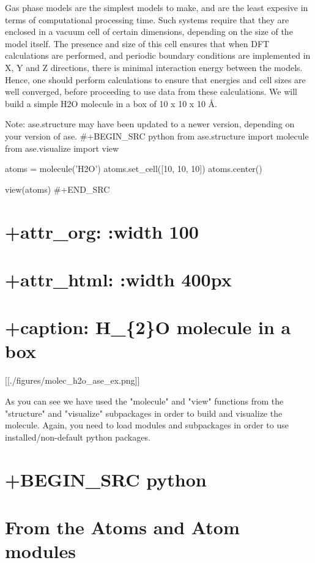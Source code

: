 \documentclass[11pt]{article}
\begin{document}
Gas phase models are the simplest models to make, and are the least
expesive in terms of computational processing time. Such systems require
that they are enclosed in a vacuum cell of certain dimensions, depending
on the size of the model itself. The presence and size of this cell
ensures that when DFT calculations are performed, and periodic boundary
conditions are implemented in X, Y and Z directions, there is minimal
interaction energy between the models. Hence, one should perform
calculations to ensure that energies and cell sizes are well converged,
before proceeding to use data from these calculations. We will build a
simple H2O molecule in a box of 10 x 10 x 10 \AA.

Note: ase.structure may have been updated to a newer version, depending
on your version of ase. \#+BEGIN\_SRC python from ase.structure import
molecule from ase.visualize import view

atoms = molecule('H2O') atoms.set\_cell({[}10, 10, 10{]}) atoms.center()

view(atoms) \#+END\_SRC

\section{+attr\_org: :width 100}\label{attr_org-width-100}

\section{+attr\_html: :width 400px}\label{attr_html-width-400px-1}

\section{+caption: H\_\{2\}O molecule in a
box}\label{caption-h_2o-molecule-in-a-box}

{[}{[}./figures/molec\_h2o\_ase\_ex.png{]}{]}

As you can see we have used the "molecule" and "view" functions from the
"structure" and "visualize" subpackages in order to build and visualize
the molecule. Again, you need to load modules and subpackages in order
to use installed/non-default python packages.

\section{+BEGIN\_SRC python}\label{begin_src-python-2}

\section{From the Atoms and Atom
modules}\label{from-the-atoms-and-atom-modules}
\end{document}
